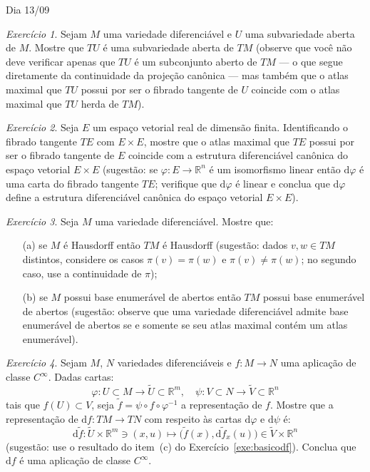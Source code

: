\documentclass[oneside,11pt]{amsart}
\newcommand{\R}{\mathds R}
\newcommand{\dd}{\mathrm d}
\theoremstyle{remark}\newtheorem{exercise}{Exercício}[section]
\theoremstyle{plain}\newtheorem{teo}{Teorema}[section]
\theoremstyle{plain}\newtheorem{lem}[teo]{Lema}
\theoremstyle{plain}\newtheorem{prop}[teo]{Proposição}
\theoremstyle{definition}\newtheorem{defin}[teo]{Definição}
\theoremstyle{remark}\newtheorem{rem}[teo]{Observação}
\theoremstyle{definition}\newtheorem{example}[teo]{Exemplo}
\numberwithin{equation}{section}
\begin{document}
\begin{section}{Dia 13/09}
\begin{exercise}
Sejam $M$ uma variedade diferenciável e $U$ uma subvariedade aberta de $M$. Mostre que $TU$ é uma subvariedade aberta de $TM$ (observe que você não deve
verificar apenas que $TU$ é um subconjunto aberto de $TM$ --- o que segue diretamente da continuidade da projeção canônica --- mas também que
o atlas maximal que $TU$ possui por ser o fibrado tangente de $U$ coincide com o atlas maximal que $TU$ herda de $TM$).
\end{exercise}

\begin{exercise}
Seja $E$ um espaço vetorial real de dimensão finita. Identificando o fibrado tangente $TE$ com $E\times E$, mostre que
o atlas maximal que $TE$ possui por ser o fibrado tangente de $E$ coincide com a estrutura diferenciável canônica do espaço vetorial $E\times E$
(sugestão: se $\varphi:E\to\R^n$ é um isomorfismo linear então $\dd\varphi$ é uma carta do fibrado tangente $TE$; verifique que $\dd\varphi$ é linear
e conclua que $\dd\varphi$ define a estrutura diferenciável canônica do espaço vetorial $E\times E$).
\end{exercise}

\begin{exercise}
Seja $M$ uma variedade diferenciável. Mostre que:
\begin{itemize}
\item[(a)] se $M$ é Hausdorff então $TM$ é Hausdorff (sugestão: dados $v,w\in TM$ distintos, considere os casos $\pi(v)=\pi(w)$ e $\pi(v)\ne\pi(w)$; no
segundo caso, use a continuidade de $\pi$);
\item[(b)] se $M$ possui base enumerável de abertos então $TM$ possui base enumerável de abertos (sugestão: observe que uma variedade diferenciável admite
base enumerável de abertos se e somente se seu atlas maximal contém um atlas enumerável).
\end{itemize}
\end{exercise}

\begin{exercise}
Sejam $M$, $N$ variedades diferenciáveis e $f:M\to N$ uma aplicação de classe $C^\infty$. Dadas cartas:
\[\varphi:U\subset M\longrightarrow\widetilde U\subset\R^m,\quad\psi:V\subset N\longrightarrow\widetilde V\subset\R^n\]
tais que $f(U)\subset V$, seja $\tilde f=\psi\circ f\circ\varphi^{-1}$ a representação de $f$. Mostre que
a representação de $\dd f:TM\to TN$ com respeito às cartas $\dd\varphi$ e $\dd\psi$ é:
\begin{equation}\label{eq:dtildef}
\dd\tilde f:\widetilde U\times\R^m\ni(x,u)\longmapsto\big(\tilde f(x),\dd\tilde f_x(u)\big)\in\widetilde V\times\R^n
\end{equation}
(sugestão: use o resultado do item~(c) do Exercício~\ref{exe:basicodf}). Conclua que $\dd f$ é uma aplicação de classe $C^\infty$.
\end{exercise}


\end{section}
\end{document}
